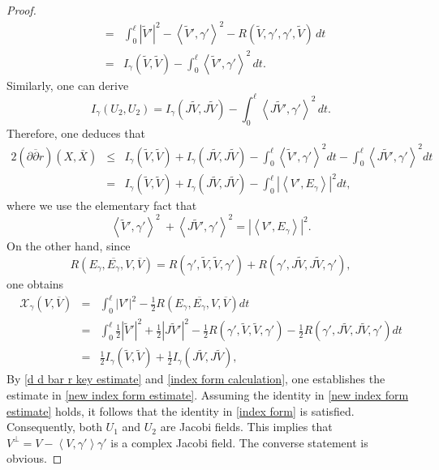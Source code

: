 \documentclass[12pt,reqno]{amsart}
\newcommand\cX{{\mathcal X}}
\newcommand\bp{{\bar\partial}}
\theoremstyle{plain}
\theoremstyle{definition}
\newcommand{\p}{\partial}
\renewcommand{\bar}{\overline}
\newcommand{\beq}{\begin{equation}}
\newcommand{\eeq}{\end{equation}}
\renewcommand{\tilde}{\widetilde}
\renewcommand{\bp}{\bar{\partial}}
\renewcommand{\>}{\rightarrow}
\newcommand{\LL}{\left\langle}
\newcommand{\RL}{\right\rangle}
\numberwithin{equation}{section} %
\renewcommand{\leq}{\leqslant}
\begin{document}
\begin{proof}
\begin{eqnarray}
        &=& \int_0^\ell |\tilde V'|^2-\LL\tilde V',\gamma'\RL^2-R(\tilde V,\gamma',\gamma',\tilde V)\,dt \nonumber\\
        &=& I_\gamma(\tilde V,\tilde V)-\int_0^\ell \LL\tilde V',\gamma'\RL^2\,dt.
    \end{eqnarray}
    Similarly, one can derive
    \beq
        I_\gamma(U_2,U_2)= I_\gamma(J\tilde V,J\tilde V)-\int_0^\ell \LL  J\tilde V ',\gamma'\RL^2\,dt.
    \eeq
    Therefore, one deduces that
    \begin{eqnarray}
        2\left(\p\bp r\right)\left(X,\bar X\right)
        &\leq&
            I_\gamma(\tilde V,\tilde V)+I_\gamma(J\tilde V,J\tilde V)
        - \int_0^\ell \LL \tilde V',\gamma'\RL^2 dt- \int_0^\ell \LL J\tilde V',\gamma'\RL^2 dt\nonumber\\
        &=&  I_\gamma(\tilde V,\tilde V)+  I_\gamma(J\tilde V,J\tilde V) -\int_0^\ell \left|\LL V',E_\gamma\RL\right|^2dt,
        \label{d d bar r key estimate}
    \end{eqnarray}
    where   we use the elementary fact that
    \beq
    \LL \tilde V',\gamma'\RL^2\ +\LL J\tilde V',\gamma'\RL^2=\left|\LL V',E_\gamma\RL\right|^2.
    \eeq
    On the other hand,  since $$R\left(E_\gamma,\bar{E_\gamma},V,\bar V\right)=R\left(\gamma',\tilde V,\tilde V,\gamma'\right) + R\left(\gamma',J\tilde V,J\tilde V,\gamma'\right),$$ one obtains
    \begin{eqnarray}
        \cX_\gamma\left(V,\bar V\right)
        &=& \int_0^\ell |V'|^2 -\frac{1}{2}R\left(E_\gamma,\bar{E_\gamma},V,\bar V\right)dt \nonumber\\
        &=& \int_0^\ell \frac{1}{2}|\tilde V'|^2 +\frac{1}{2}|J\tilde V'|^2-\frac{1}{2}R\left(\gamma',\tilde V,\tilde V,\gamma'\right) -\frac{1}{2} R\left(\gamma',J\tilde V,J\tilde V,\gamma'\right)dt \nonumber\\
        &=& \frac{1}{2} I_\gamma(\tilde V,\tilde V)+ \frac{1}{2} I_\gamma(J\tilde V,J\tilde V) ,\label{index form calculation}
    \end{eqnarray}
    By \eqref{d d bar r key estimate} and \eqref{index form calculation}, one establishes the estimate in \eqref{new index form estimate}.
    Assuming the identity in \eqref{new index form estimate} holds, it follows that the identity in \eqref{index form} is satisfied. Consequently, both $U_1$ and
    $U_2$   are Jacobi fields. This implies that $V^\perp=V-\LL V,\gamma'\RL\gamma'$ is a complex  Jacobi field. The converse statement is obvious.
\end{proof}
\end{document}
